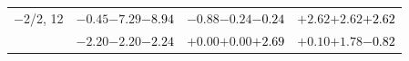 \documentclass[compress]{beamer}
\begin{document}
\begin{frame}
\begin{tabular}{r | c | c | c}
$-$2/2, 12 & $-0.45$\hspace{0.1 cm}$-7.29$\hspace{0.1 cm}\textcolor{black}{$-8.94$} & $-0.88$\hspace{0.1 cm}$-0.24$\hspace{0.1 cm}\textcolor{black}{$-0.24$} & $+2.62$\hspace{0.1 cm}$+2.62$\hspace{0.1 cm}\textcolor{black}{$+2.62$} \\
           & $-2.20$\hspace{0.1 cm}$-2.20$\hspace{0.1 cm}\textcolor{black}{$-2.24$} & $+0.00$\hspace{0.1 cm}$+0.00$\hspace{0.1 cm}\textcolor{black}{$+2.69$} & $+0.10$\hspace{0.1 cm}$+1.78$\hspace{0.1 cm}\textcolor{black}{$-0.82$} \\
\end{tabular}
\end{frame}
\end{document}
